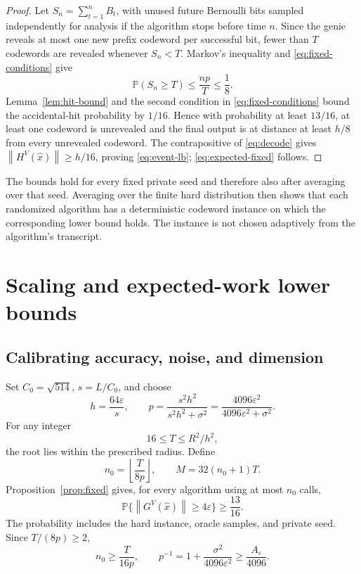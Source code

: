\documentclass[11pt,a4paper]{article}
\newcommand{\Pp}{\mathbb P}
\newcommand{\eps}{\varepsilon}
\newcommand{\norm}[1]{\left\lVert #1\right\rVert}
\theoremstyle{definition}
\theoremstyle{remark}
\begin{document}
\begin{proof}
Let $S_n=\sum_{t=1}^nB_t$, with unused future Bernoulli bits sampled independently for analysis if the algorithm stops before time $n$.  Since the genie reveals at most one new prefix codeword per successful bit, fewer than $T$ codewords are revealed whenever $S_n<T$.  Markov's inequality and \eqref{eq:fixed-conditions} give
\[
 \Pp(S_n\ge T)\le\frac{np}{T}\le\frac18.
\]
Lemma~\ref{lem:hit-bound} and the second condition in \eqref{eq:fixed-conditions} bound the accidental-hit probability by $1/16$.  Hence with probability at least $13/16$, at least one codeword is unrevealed and the final output is at distance at least $h/8$ from every unrevealed codeword.  The contrapositive of \eqref{eq:decode} gives $\norm{H^V(\widehat x)}\ge h/16$, proving \eqref{eq:event-lb}; \eqref{eq:expected-fixed} follows.
\end{proof}

The bounds hold for every fixed private seed and therefore also after
averaging over that seed. Averaging over the finite hard distribution then
shows that each randomized algorithm has a deterministic codeword instance
on which the corresponding lower bound holds. The instance is not chosen
adaptively from the algorithm's transcript.

\section{Scaling and expected-work lower bounds}\label{sec:mainproof}

\subsection{Calibrating accuracy, noise, and dimension}
Set $C_0=\sqrt{514}$, $s=L/C_0$, and choose
\begin{equation}\label{eq:parameters}
 h=\frac{64\eps}{s},\qquad
 p=\frac{s^2h^2}{s^2h^2+\sigma^2}
   =\frac{4096\eps^2}{4096\eps^2+\sigma^2}.
\end{equation}
For any integer
\begin{equation}\label{eq:T-range}
 16\le T\le R^2/h^2,
\end{equation}
the root lies within the prescribed radius. Define
\begin{equation}\label{eq:nM}
 n_0=\left\lfloor\frac{T}{8p}\right\rfloor,
 \qquad M=32(n_0+1)T.
\end{equation}
Proposition~\ref{prop:fixed} gives, for every algorithm using at most $n_0$
calls,
\begin{equation}\label{eq:fixed-scaled}
 \Pp\{\norm{G^V(\widehat x)}\ge4\eps\}\ge\frac{13}{16}.
\end{equation}
The probability includes the hard instance, oracle samples, and private seed.
Since $T/(8p)\ge2$,
\begin{equation}\label{eq:n-lower}
 n_0\ge\frac{T}{16p},\qquad
 p^{-1}=1+\frac{\sigma^2}{4096\eps^2}\ge\frac{A_\eps}{4096}.
\end{equation}
\end{document}
